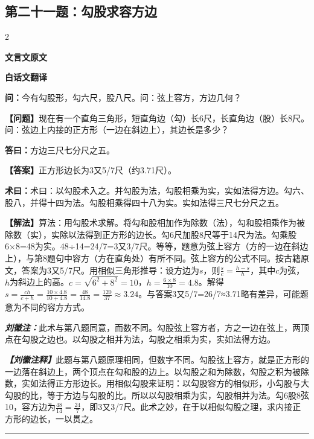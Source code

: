 \documentclass[10pt,a4paper]{article}
\newcommand{\wen}[1]{\textbf{\color{problemcolor}问：}#1\par}
\newcommand{\da}[1]{\textbf{答曰：}#1\par}
\newcommand{\shu}[1]{\textbf{术曰：}#1\par}
\newcommand{\liuhui}[1]{{\color{commentarycolor}\textit{\textbf{刘徽注：}}#1\par}}
\newcommand{\classicalheader}[1]{{\centering\large\bfseries\color{classicalcolor} #1\par\vspace{0.5em}}}
\newcommand{\wenmodern}[1]{\textbf{\color{moderncolor}【问题】}#1\par}
\newcommand{\damodern}[1]{\textbf{【答案】}#1\par}
\newcommand{\shumodern}[1]{\textbf{【解法】}#1\par}
\newcommand{\liuhuimodern}[1]{{\color{commentarycolor}\textit{\textbf{【刘徽注释】}}#1\par}}
\newcommand{\modernheader}[1]{{\centering\large\bfseries\color{moderncolor} #1\par\vspace{0.5em}}}
\newcommand{\problemsec}[1]{\subsection*{#1}}
\begin{document}
\problemsec{第二十一题：勾股求容方边}
\begin{paracol}{2}
\classicalheader{文言文原文}
\switchcolumn
\modernheader{白话文翻译}
\switchcolumn*

\wen{今有勾股形，勾六尺，股八尺。问：弦上容方，方边几何？}

\switchcolumn

\wenmodern{现在有一个直角三角形，短直角边（勾）长6尺，长直角边（股）长8尺。问：弦边上内接的正方形（一边在斜边上），其边长是多少？}

\switchcolumn*

\da{方边三尺七分尺之五。}

\switchcolumn

\damodern{正方形边长为3又5/7尺（约3.71尺）。}

\switchcolumn*

\shu{术曰：以勾股术入之。并勾股为法，勾股相乘为实，实如法得方边。勾六、股八，并得十四为法。勾股相乘得四十八为实。实如法得三尺七分尺之五。}

\switchcolumn

\shumodern{算法：用勾股术求解。将勾和股相加作为除数（法），勾和股相乘作为被除数（实），实除以法得到正方形的边长。勾6尺加股8尺等于14尺为法。勾乘股6×8=48为实。48÷14=24/7=3又3/7尺。等等，题意为弦上容方（方的一边在斜边上），与第8题句中容方（方在直角处）有所不同。弦上容方的公式不同。按古籍原文，答案为3又5/7尺。用相似三角形推导：设方边为$s$，则$\frac{s}{c}=\frac{h-s}{h}$，其中$c$为弦，$h$为斜边上的高。$c=\sqrt{6^2+8^2}=10$，$h=\frac{6\times8}{10}=4.8$。解得$s=\frac{ch}{c+h}=\frac{10\times4.8}{10+4.8}=\frac{48}{14.8}=\frac{120}{37}\approx3.24$。与答案3又5/7=26/7≈3.71略有差异，可能题意为不同的容方方式。}

\switchcolumn*

\liuhui{此术与第八题同意，而数不同。勾股弦上容方者，方之一边在弦上，两顶点在勾股之边也。以勾股之相并为法，勾股之相乘为实，实如法得方边。}

\switchcolumn

\liuhuimodern{此题与第八题原理相同，但数字不同。勾股弦上容方，就是正方形的一边落在斜边上，两个顶点在勾和股的边上。以勾股之和为除数，勾股之积为被除数，实如法得正方形边长。用相似勾股来证明：以勾股容方的相似形，小勾股与大勾股的比，等于方边与勾股的比。所以以勾股相乘为实，勾股相并为法。勾6股8弦10，容方边为$\frac{48}{14}=\frac{24}{7}$，即3又3/7尺。此术之妙，在于以相似勾股之理，求内接正方形的边长，一以贯之。}

\end{paracol}

\vspace{0.3cm}
\hrule
\vspace{0.3cm}
\end{document}
